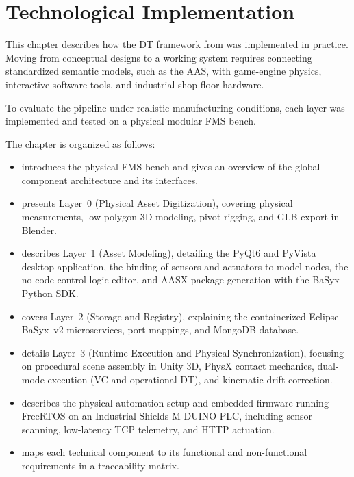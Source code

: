 
%

\chapter{Technological Implementation}
\label{cha:implementation}

This chapter describes how the \gls{DT} framework from  was implemented in practice. Moving from conceptual designs to a working system requires connecting standardized semantic models, such as the \gls{AAS}, with game-engine physics, interactive software tools, and industrial shop-floor hardware.

To evaluate the pipeline under realistic manufacturing conditions, each layer was implemented and tested on a physical modular \gls{FMS} bench.

The chapter is organized as follows:
\begin{itemize}
    \item {} introduces the physical \gls{FMS} bench and gives an overview of the global component architecture and its interfaces.
    \item {} presents Layer~0 (Physical Asset Digitization), covering physical measurements, low-polygon 3D modeling, pivot rigging, and \gls{GLB} export in Blender.
    \item {} describes Layer~1 (Asset Modeling), detailing the PyQt6 and PyVista desktop application, the binding of sensors and actuators to model nodes, the no-code control logic editor, and \gls{AASX} package generation with the BaSyx Python \gls{SDK}.
    \item {} covers Layer~2 (Storage and Registry), explaining the containerized Eclipse BaSyx~v2 microservices, port mappings, and MongoDB database.
    \item {} details Layer~3 (Runtime Execution and Physical Synchronization), focusing on procedural scene assembly in Unity 3D, PhysX contact mechanics, dual-mode execution (\gls{VC} and operational \gls{DT}), and kinematic drift correction.
    \item {} describes the physical automation setup and embedded firmware running FreeRTOS on an Industrial Shields M-DUINO \gls{PLC}, including sensor scanning, low-latency \gls{TCP} telemetry, and \gls{HTTP} actuation.
    \item {} maps each technical component to its functional and non-functional requirements in a traceability matrix.
\end{itemize}

